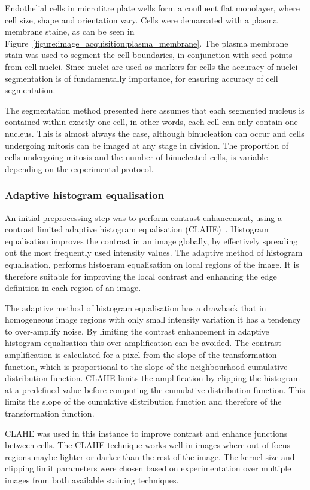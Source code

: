 Endothelial cells in microtitre plate wells form a confluent flat monolayer, where cell size, shape and orientation vary. Cells were demarcated with a plasma membrane staine, as can be seen in Figure~\ref{figure:image_acquisition:plasma_membrane}. The plasma membrane stain was used to segment the cell boundaries, in conjunction with seed points from cell nuclei. Since nuclei are used as markers for cells the accuracy of nuclei segmentation is of fundamentally importance, for ensuring accuracy of cell segmentation.

The segmentation method presented here assumes that each segmented nucleus is contained within exactly one cell, in other words, each cell can only contain one nucleus. This is almost always the case, although binucleation can occur and cells undergoing mitosis can be imaged at any stage in division. The proportion of cells undergoing mitosis and the number of binucleated cells, is variable depending on the experimental protocol.

\subsubsection{Adaptive histogram equalisation}
An initial preprocessing step was to perform contrast enhancement, using a contrast limited adaptive histogram equalisation (CLAHE)~\cite{Ketcham1974}. Histogram equalisation improves the contrast in an image globally, by effectively spreading out the most frequently used intensity values. The adaptive method of histogram equalisation, performs histogram equalisation on local regions of the image. It is therefore suitable for improving the local contrast and enhancing the edge definition in each region of an image.

The adaptive method of histogram equalisation has a drawback that in homogeneous image regions with only small intensity variation it has a tendency to over-amplify noise. By limiting the contrast enhancement in adaptive histogram equalisation this over-amplification can be avoided. The contrast amplification is calculated for a pixel from the slope of the transformation function, which is proportional to the slope of the neighbourhood cumulative distribution function. CLAHE limits the amplification by clipping the histogram at a predefined value before computing the cumulative distribution function. This limits the slope of the cumulative distribution function and therefore of the transformation function.

CLAHE was used in this instance to improve contrast and enhance junctions between cells. The CLAHE technique works well in images where out of focus regions maybe lighter or darker than the rest of the image. The kernel size and clipping limit parameters were chosen based on experimentation over multiple images from both available staining techniques.

